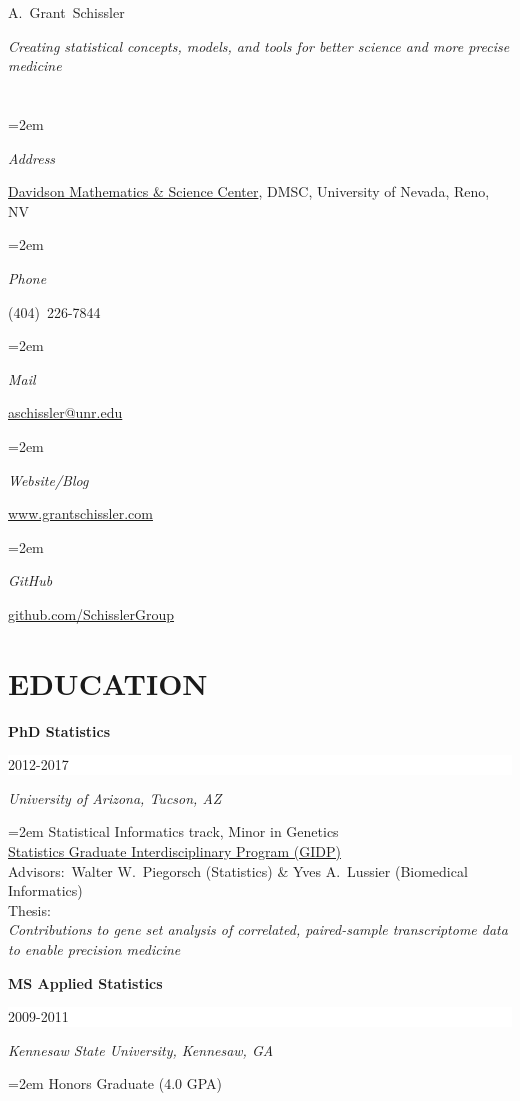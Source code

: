 \documentclass[paper=a4,fontsize=11pt]{scrartcl} %
\newlength{\spacebox}
\newcommand{\sepspace}{\vspace*{1em}}		%
\newcommand{\MyName}[1]{ %
		\LARGE \usefont{OT1}{phv}{b}{n} \hfill #1
		\par \normalsize \normalfont}
\newcommand{\MySlogan}[1]{ %
		\large \usefont{OT1}{phv}{m}{n}\hfill \textit{#1}
		\par \normalsize \normalfont}
\newcommand{\NewPart}[2]{\section*{\uppercase{#1} #2 }}
\newcommand{\PersonalEntry}[2]{
		\noindent\hangindent=2em\hangafter=0 %
		\parbox{\spacebox}{        %
		\textit{#1}}		       %
		\hspace{1.5em} #2 \par}    %
\newcommand{\EducationEntry}[4]{
		\noindent \textbf{#1} \hfill      %
		\colorbox{White}{%
			\parbox{6em}{%
			\hfill\color{Black}#2}} \par  %
		\noindent \textit{#3} \par        %
		\noindent\hangindent=2em\hangafter=0 \small #4 %
		\normalsize \par \vspace{-7pt}}
\begin{document}
 


\MyName{A.~Grant~Schissler}
\vspace{5pt}
\textit{Creating statistical concepts, models, and tools for better science and more precise medicine}
\vspace{-20pt}

\NewPart{}{}
\vspace{-8pt}
\PersonalEntry{Address}{\href{https://www.google.com/maps/place/Davidson+Mathematics+\%26+Science+Center,+Reno,+NV+89557/@39.539006,-119.8146246,17z/data=!3m1!4b1!4m5!3m4!1s0x809947387fd92c01:0xb648889cd182b3ae!8m2!3d39.538944!4d-119.8123508}{Davidson Mathematics \& Science Center}, DMSC, University of Nevada, Reno, NV}
\PersonalEntry{Phone}{(404)~226-7844}
\PersonalEntry{Mail}{\href{mailto:aschissler@unr.edu}{aschissler@unr.edu}}
\PersonalEntry{Website/Blog}{\href{http://www.grantschissler.com}{www.grantschissler.com}}
\PersonalEntry{GitHub}{\href{https://github.com/SchisslerGroup}{github.com/SchisslerGroup}}
\vspace{-7pt}
\NewPart{Education}{}
\vspace{-7pt}
\EducationEntry{PhD Statistics}{2012-2017}{University of Arizona, Tucson, AZ}{Statistical Informatics track, Minor in Genetics\\\href{http://stat.arizona.edu}{Statistics Graduate Interdisciplinary Program (GIDP)}\\Advisors:~Walter W.~Piegorsch (Statistics) \& Yves A.~Lussier (Biomedical Informatics)\\Thesis:\\\textit{Contributions to gene set analysis of correlated, paired-sample transcriptome data to enable precision medicine}}
\sepspace

\EducationEntry{MS Applied Statistics}{2009-2011}{Kennesaw State University, Kennesaw, GA}{Honors Graduate (4.0 GPA)}
\sepspace
\end{document}
